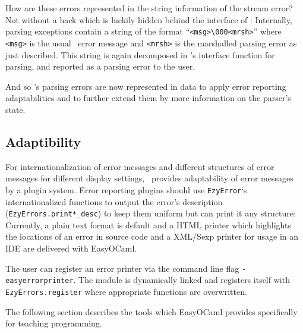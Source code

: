 How are these errors represented in the string information of the stream error?
Not without a hack which is luckily hidden behind the interface of \camlpf:
Internally, parsing exceptions contain a string of the format
``\texttt{<msg>\textbackslash 000<mrsh>}'' where \texttt{<msg>} is
the usual \camlpf\ error message and \texttt{<mrsh>} is the marshalled parsing
error as just described.
This string is again decomposed in \camlpf's interface function for
parsing, and reported as
a parsing error to the user.

And so \camlpf's parsing errors are now represented in data to apply error
reporting adaptabilities and to further extend them by more information on the
parser's state.

\subsection{Adaptibility}

For internationalization of error messages and different structures of error
messages for different display settings, \easyocaml\ provides adaptability of
error messages by a plugin system.  Error reporting plugins should use
\texttt{EzyError}`s internationalized functions to output the error's
description (\texttt{EzyErrors.print*\_desc}) to keep them uniform but can
print it any structure:  Currently, a plain text format is default and a HTML
printer which highlights the locations of an error in source code and a
XML/Sexp printer for usage in an IDE are delivered with EasyOCaml.

The user can register an error printer via the command line flag 
\texttt{-easyerrorprinter}.  The module is dynamically linked and 
registers itself with \texttt{EzyErrors.register} where appropriate 
functions are overwritten.

The following section describes the tools which EasyOCaml provides 
specifically for teaching programming.

